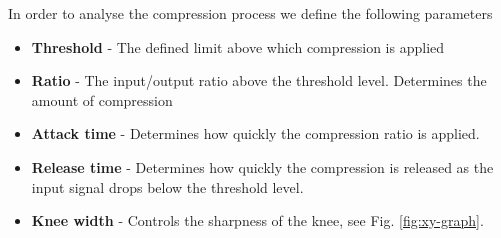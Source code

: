 \documentclass[../main2.tex]{subfiles}
\begin{document}
In order to analyse the compression process we define the following parameters
\begin{itemize}
\item{\textbf{Threshold} - The defined limit above which compression is applied }
\item{\textbf{Ratio} - The input/output ratio above the threshold level. Determines the amount of compression}
\item{\textbf{Attack time} - Determines how quickly the compression ratio is applied.}
\item{\textbf{Release time} - Determines how quickly the compression is released as the input signal drops below the threshold level.}
\item{\textbf{Knee width} - Controls the sharpness of the knee, see Fig. \ref{fig:xy-graph}.}
\end{itemize}
\end{document}
